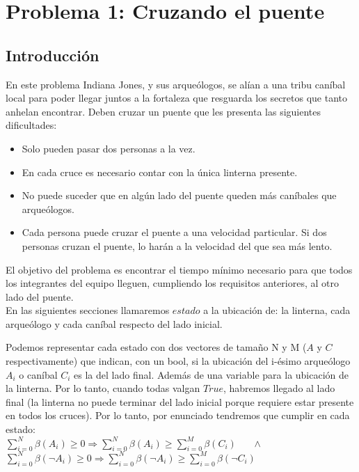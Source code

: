 \section{Problema 1: Cruzando el puente}

\subsection{Introducción}
		En este problema Indiana Jones, y sus arqueólogos, se alían a una tribu caníbal local para poder llegar juntos a la fortaleza que resguarda los secretos que tanto anhelan encontrar. Deben cruzar un puente que les presenta las siguientes dificultades:

			\begin{itemize}
				\item Solo pueden pasar dos personas a la vez.
				\item En cada cruce es necesario contar con la única linterna presente.
				\item No puede suceder que en algún lado del puente queden más caníbales que arqueólogos.
				\item Cada persona puede cruzar el puente a una velocidad particular. Si dos personas cruzan el puente, lo harán a la velocidad del que sea más lento.
			\end{itemize}

		El objetivo del problema es encontrar el tiempo mínimo necesario para que todos los integrantes del equipo lleguen, cumpliendo los requisitos anteriores, al otro lado del puente.
		\\

		En las siguientes secciones llamaremos $estado$ a la ubicación de: la linterna, cada arqueólogo y cada caníbal respecto del lado inicial.

		Podemos representar cada estado con dos vectores de tamaño N y M ($A$ y $C$ respectivamente) que indican, con un bool, si la ubicación del i-ésimo arqueólogo $A_i$ o caníbal $C_i$ es la del lado final. Además de una variable para la ubicación de la linterna. Por lo tanto, cuando todas valgan $True$, habremos llegado al lado final (la linterna no puede terminar del lado inicial porque requiere estar presente en todos los cruces). Por lo tanto, por enunciado tendremos que cumplir en cada estado:
		\\

		$\sum_{i=0}^{N}\beta(A_i) \ge 0 \Rightarrow \sum_{i=0}^{N}\beta(A_i) \ge \sum_{i=0}^{M}\beta(C_i)  $
		\ \ \
		$\wedge$
		\ \ \
		$\sum_{i=0}^{N}\beta(\neg A_i) \ge 0 \Rightarrow \sum_{i=0}^{N}\beta(\neg A_i) \ge \sum_{i=0}^{M}\beta(\neg C_i)$
		\\

